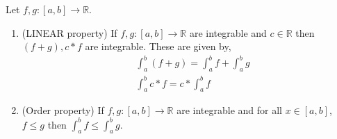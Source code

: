 \begin{Theorem}[name=Properties of Riemann integral]
 Let $f,g : \left[a,b\right] \to \mathbb{R}$.
    \begin{enumerate}
	\item (LINEAR property) If $f,g : \left[a,b\right] \to \mathbb{R}$ are integrable and $c \in
	    \mathbb{R}$ then $(f+g), c*f$ are integrable. These are given by,
	    \begin{displaymath}
		\begin{aligned}
		    &\int_a^b (f+g) = \int_a^b f + \int_a^b g \\
		    & \int_a^b c*f = c*\int_a^b f
		\end{aligned}
	    \end{displaymath}
	\item (Order property) If $f,g : \left[a,b\right] \to \mathbb{R}$ are integrable and for all
	    $x \in \left[a,b\right]$, $f \leq g$ then $\int_a^b f \leq \int_a^b g$.
    \end{enumerate}
\end{Theorem}
